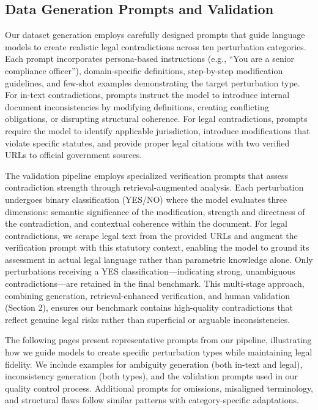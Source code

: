 \documentclass[11pt]{article}
\begin{document}
\subsection{Data Generation Prompts and Validation}
\label{sec:appendix-generation}

Our dataset generation employs carefully designed prompts that guide language models to create realistic legal contradictions across ten perturbation categories. Each prompt incorporates persona-based instructions (e.g., ``You are a senior compliance officer''), domain-specific definitions, step-by-step modification guidelines, and few-shot examples demonstrating the target perturbation type. For in-text contradictions, prompts instruct the model to introduce internal document inconsistencies by modifying definitions, creating conflicting obligations, or disrupting structural coherence. For legal contradictions, prompts require the model to identify applicable jurisdiction, introduce modifications that violate specific statutes, and provide proper legal citations with two verified URLs to official government sources.

The validation pipeline employs specialized verification prompts that assess contradiction strength through retrieval-augmented analysis. Each perturbation undergoes binary classification (YES/NO) where the model evaluates three dimensions: semantic significance of the modification, strength and directness of the contradiction, and contextual coherence within the document. For legal contradictions, we scrape legal text from the provided URLs and augment the verification prompt with this statutory context, enabling the model to ground its assessment in actual legal language rather than parametric knowledge alone. Only perturbations receiving a YES classification—indicating strong, unambiguous contradictions—are retained in the final benchmark. This multi-stage approach, combining generation, retrieval-enhanced verification, and human validation (Section 2), ensures our benchmark contains high-quality contradictions that reflect genuine legal risks rather than superficial or arguable inconsistencies.

The following pages present representative prompts from our pipeline, illustrating how we guide models to create specific perturbation types while maintaining legal fidelity. We include examples for ambiguity generation (both in-text and legal), inconsistency generation (both types), and the validation prompts used in our quality control process. Additional prompts for omissions, misaligned terminology, and structural flaws follow similar patterns with category-specific adaptations.
\end{document}

